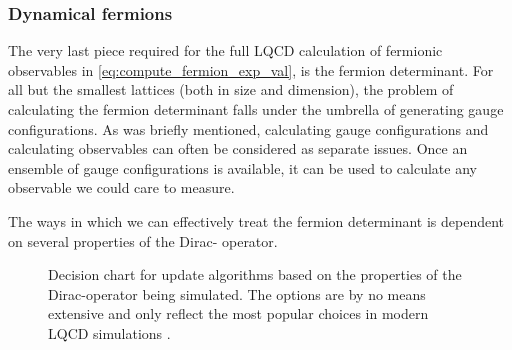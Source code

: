 \documentclass[a4paper,10pt]{article}
\begin{document}
\subsubsection{Dynamical fermions}
The very last piece required for the full LQCD calculation of fermionic observables in \eqref{eq:compute_fermion_exp_val}, is the fermion determinant. For all but the smallest lattices (both in size and dimension), the problem of calculating the fermion determinant falls under the umbrella of generating gauge configurations. As was briefly mentioned, calculating gauge configurations and calculating observables can often be considered as separate issues. Once an ensemble of gauge configurations is available, it can be used to calculate any observable we could care to measure.

The ways in which we can effectively treat the fermion determinant is dependent on several properties of the Dirac- operator.

\begin{figure}[H]
\centering
{}
\caption{Decision chart for update algorithms based on the properties of the Dirac-operator being simulated. The options are by no means extensive and only reflect the most popular choices in modern LQCD simulations \cite{schaefer2012status}.}
\end{figure}
\end{document}

